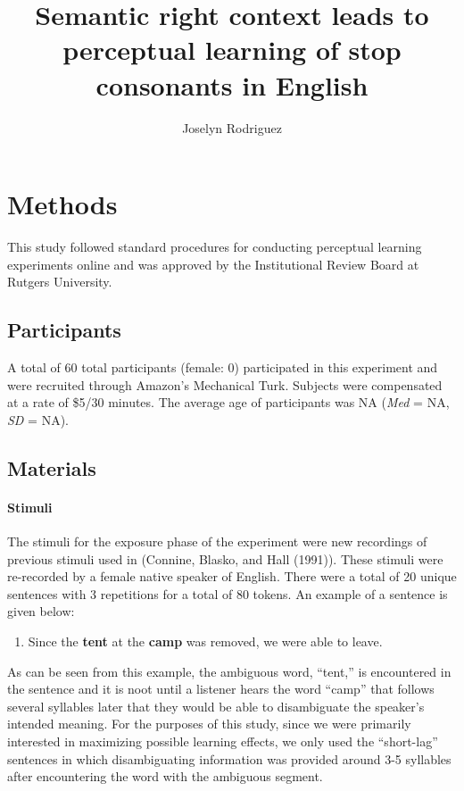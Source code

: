 \documentclass[
  english,
  man]{apa6}
\title{Semantic right context leads to perceptual learning of stop consonants in English}
\author{Joselyn Rodriguez\textsuperscript{}}
\date{}
\affiliation{\phantom{0}}
\providecommand{\tightlist}{%
  \setlength{\itemsep}{0pt}\setlength{\parskip}{0pt}}
\let\oldparagraph\paragraph
\renewcommand{\paragraph}[1]{\oldparagraph{#1}\mbox{}}
\begin{document}
\maketitle

\hypertarget{methods}{%
\section{Methods}\label{methods}}

This study followed standard procedures for conducting perceptual learning experiments online and was approved by the Institutional Review Board at Rutgers University.

\hypertarget{participants}{%
\subsection{Participants}\label{participants}}

A total of 60 total participants (female: 0) participated in this experiment and were recruited through Amazon's Mechanical Turk. Subjects were compensated at a rate of \$5/30 minutes. The average age of participants was NA (\emph{Med} = NA, \emph{SD} = NA).

\hypertarget{materials}{%
\subsection{Materials}\label{materials}}

\hypertarget{stimuli}{%
\paragraph{Stimuli}\label{stimuli}}

The stimuli for the exposure phase of the experiment were new recordings of previous stimuli used in (Connine, Blasko, and Hall (1991)). These stimuli were re-recorded by a female native speaker of English. There were a total of 20 unique sentences with 3 repetitions for a total of 80 tokens. An example of a sentence is given below:

\begin{enumerate}
\def\labelenumi{(\arabic{enumi})}
\tightlist
\item
  Since the \textbf{tent} at the \textbf{camp} was removed, we were able to leave.
\end{enumerate}

As can be seen from this example, the ambiguous word, ``tent,'' is encountered in the sentence and it is noot until a listener hears the word ``camp'' that follows several syllables later that they would be able to disambiguate the speaker's intended meaning. For the purposes of this study, since we were primarily interested in maximizing possible learning effects, we only used the ``short-lag'' sentences in which disambiguating information was provided around 3-5 syllables after encountering the word with the ambiguous segment.
\end{document}
